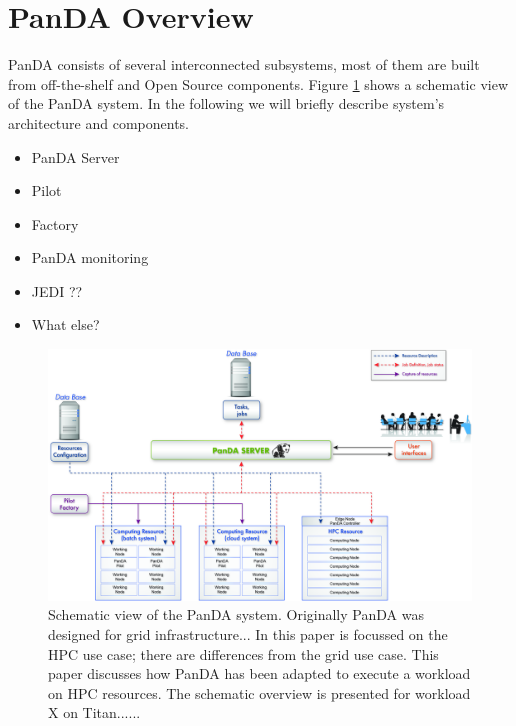 \documentclass[10pt, conference, compsocconf]{IEEEtran}
\begin{document}
\section{PanDA Overview}\label{sec:panda_overview}
PanDA consists of several interconnected subsystems, most of them are built from off-the-shelf and Open Source components. Figure \ref{fig:architecture} shows a schematic view of the PanDA system.
In the following we will briefly describe system’s architecture and components.

\begin{itemize}
\item PanDA Server
\item Pilot
\item Factory
\item PanDA monitoring
\item JEDI ??
\item What else?
\end{itemize}


\begin{figure}
\begin{center}
\includegraphics[width=\columnwidth]{figures/PandaArch.jpg}
\caption{Schematic view of the PanDA system\label{fig:architecture}. 
  Originally PanDA was designed for grid infrastructure... In this paper
  is focussed on the HPC use case; there are differences from  the grid use
  case. This paper discusses how PanDA has been adapted to execute a workload on
  HPC resources. The schematic overview is presented for workload X on Titan......}
\end{center}
\end{figure}
\end{document}
